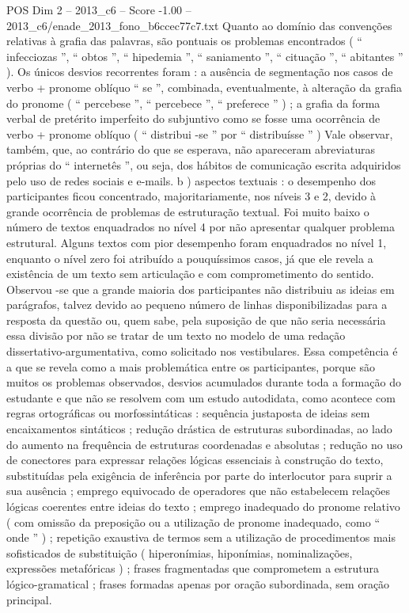 \begin{textsample}{POS Dim 2 – 2013\_c6 – Score -1.00 – 2013\_c6/enade\_2013\_fono\_b6ccec77c7.txt}
Quanto ao domínio das convenções relativas à grafia das palavras, são pontuais os problemas encontrados ( “ infecciozas ”, “ obtos ”, “ hipedemia ”, “ saniamento ”, “ cituação ”, “ abitantes ” ).
Os únicos desvios recorrentes foram : a ausência de segmentação nos casos de verbo + pronome oblíquo “ se ”, combinada, eventualmente, à alteração da grafia do pronome ( “ percebese ”, “ percebece ”, “ preferece ” ) ; a grafia da forma verbal de pretérito imperfeito do subjuntivo como se fosse uma ocorrência de verbo + pronome oblíquo ( “ distribui -se ” por “ distribuísse ” ) Vale observar, também, que, ao contrário do que se esperava, não apareceram abreviaturas próprias do “ internetês ”, ou seja, dos hábitos de comunicação escrita adquiridos pelo uso de redes sociais e e-mails. b ) aspectos textuais : o desempenho dos participantes ficou concentrado, majoritariamente, nos níveis 3 e 2, devido à grande ocorrência de problemas de estruturação textual.
Foi muito baixo o número de textos enquadrados no nível 4 por não apresentar qualquer problema estrutural.
Alguns textos com pior desempenho foram enquadrados no nível 1, enquanto o nível zero foi atribuído a pouquíssimos casos, já que ele revela a existência de um texto sem articulação e com comprometimento do sentido.
Observou -se que a grande maioria dos participantes não distribuiu as ideias em parágrafos, talvez devido ao pequeno número de linhas disponibilizadas para a resposta da questão ou, quem sabe, pela suposição de que não seria necessária essa divisão por não se tratar de um texto no modelo de uma redação dissertativo-argumentativa, como solicitado nos vestibulares.
Essa competência é a que se revela como a mais problemática entre os participantes, porque são muitos os problemas observados, desvios acumulados durante toda a formação do estudante e que não se resolvem com um estudo autodidata, como acontece com regras ortográficas ou morfossintáticas : sequência justaposta de ideias sem encaixamentos sintáticos ; redução drástica de estruturas subordinadas, ao lado do aumento na frequência de estruturas coordenadas e absolutas ; redução no uso de conectores para expressar relações lógicas essenciais à construção do texto, substituídas pela exigência de inferência por parte do interlocutor para suprir a sua ausência ; emprego equivocado de operadores que não estabelecem relações lógicas coerentes entre ideias do texto ; emprego inadequado do pronome relativo ( com omissão da preposição ou a utilização de pronome inadequado, como “ onde ” ) ; repetição exaustiva de termos sem a utilização de procedimentos mais sofisticados de substituição ( hiperonímias, hiponímias, nominalizações, expressões metafóricas ) ; frases fragmentadas que comprometem a estrutura lógico-gramatical ; frases formadas apenas por oração subordinada, sem oração principal.

\end{textsample}

